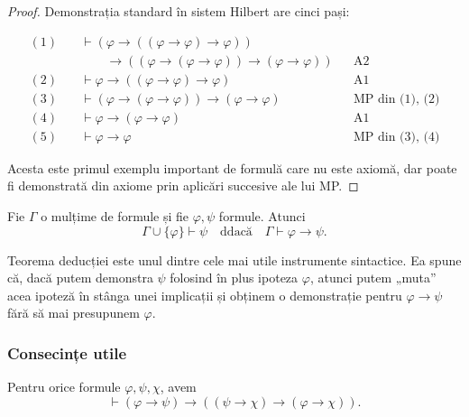\begin{proof}
	Demonstrația standard în sistem Hilbert are cinci pași:

	\[
		\begin{aligned}
			(1)\quad & \vdash (\varphi \to ((\varphi \to \varphi) \to \varphi))                                               \\
			         & \qquad \to ((\varphi \to (\varphi \to \varphi)) \to (\varphi \to \varphi)) &  & \text{A2}              \\
			(2)\quad & \vdash \varphi \to ((\varphi \to \varphi) \to \varphi)                     &  & \text{A1}              \\
			(3)\quad & \vdash (\varphi \to (\varphi \to \varphi)) \to (\varphi \to \varphi)       &  & \text{MP din (1), (2)} \\
			(4)\quad & \vdash \varphi \to (\varphi \to \varphi)                                   &  & \text{A1}              \\
			(5)\quad & \vdash \varphi \to \varphi                                                 &  & \text{MP din (3), (4)}
		\end{aligned}
	\]

	Acesta este primul exemplu important de formulă care nu este axiomă, dar poate fi demonstrată din axiome prin aplicări succesive ale lui MP.
\end{proof}

\begin{theorem}
	\label{th:deductie}
	Fie \( \Gamma \) o mulțime de formule și fie \( \varphi, \psi \) formule. Atunci
	\[
		\Gamma \cup \{\varphi\} \vdash \psi \quad \text{ddacă} \quad \Gamma \vdash \varphi \to \psi.
	\]
\end{theorem}

Teorema deducției este unul dintre cele mai utile instrumente sintactice. Ea spune că, dacă putem demonstra \( \psi \) folosind în plus ipoteza \( \varphi \),
atunci putem „muta” acea ipoteză în stânga unei implicații și obținem o demonstrație pentru \( \varphi \to \psi \) fără să mai presupunem \( \varphi \).

\subsubsection*{Consecințe utile}

\begin{prop}
	Pentru orice formule \( \varphi, \psi, \chi \), avem
	\[
		\vdash (\varphi \to \psi) \to ((\psi \to \chi) \to (\varphi \to \chi)).
	\]
\end{prop}

